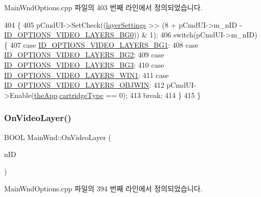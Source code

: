 Main\+Wnd\+Options.\+cpp 파일의 403 번째 라인에서 정의되었습니다.


\begin{DoxyCode}
404 \{
405   pCmdUI->SetCheck((\mbox{\hyperlink{_globals_8cpp_aab45842fd405c5c9c24494c026a4441f}{layerSettings}} >> (8 + pCmdUI->m\_nID - 
      \mbox{\hyperlink{resource_8h_aa55a1b0cac56f9f05586ac1594a8b539}{ID\_OPTIONS\_VIDEO\_LAYERS\_BG0}})) & 1);
406   \textcolor{keywordflow}{switch}(pCmdUI->m\_nID) \{
407   \textcolor{keywordflow}{case} \mbox{\hyperlink{resource_8h_a303dbabbad7e89a0565f244f565c05f0}{ID\_OPTIONS\_VIDEO\_LAYERS\_BG1}}:
408   \textcolor{keywordflow}{case} \mbox{\hyperlink{resource_8h_a8f1a359406986b4270e97e4989b4675e}{ID\_OPTIONS\_VIDEO\_LAYERS\_BG2}}:
409   \textcolor{keywordflow}{case} \mbox{\hyperlink{resource_8h_ad6f4797521ceb1142f5fd6672328c1ea}{ID\_OPTIONS\_VIDEO\_LAYERS\_BG3}}:
410   \textcolor{keywordflow}{case} \mbox{\hyperlink{resource_8h_a697ada93ac269b38ff8de035413838bc}{ID\_OPTIONS\_VIDEO\_LAYERS\_WIN1}}:
411   \textcolor{keywordflow}{case} \mbox{\hyperlink{resource_8h_adb23bde221757443279d5364a38ba07a}{ID\_OPTIONS\_VIDEO\_LAYERS\_OBJWIN}}:
412     pCmdUI->Enable(\mbox{\hyperlink{_v_b_a_8cpp_a8095a9d06b37a7efe3723f3218ad8fb3}{theApp}}.\mbox{\hyperlink{class_v_b_a_af300759fcbc7eeb00ce73f956fc5ddb7}{cartridgeType}} == 0);
413     \textcolor{keywordflow}{break};
414   \}
415 \}
\end{DoxyCode}
\mbox{\label{class_main_wnd_aba2fc4c22ea3cbda1187a08a85eeebbe}} 
\subsubsection{\texorpdfstring{On\+Video\+Layer()}{OnVideoLayer()}}
{\footnotesize\ttfamily B\+O\+OL Main\+Wnd\+::\+On\+Video\+Layer (\begin{DoxyParamCaption}\item[{U\+I\+NT}]{n\+ID }\end{DoxyParamCaption})}



Main\+Wnd\+Options.\+cpp 파일의 394 번째 라인에서 정의되었습니다.



